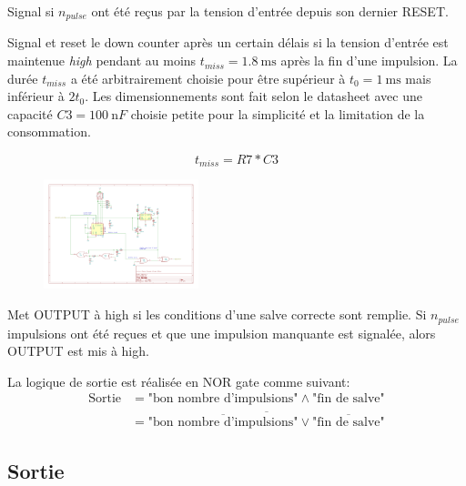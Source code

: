 \documentclass[french]{layout/Report}
\begin{document}
\begin{description}[leftmargin=!,labelwidth=4cm, labelindent=\parindent]
	\item[Down counter] Signal si $n_{pulse}$ ont été reçus par la tension d'entrée depuis son dernier RESET.
	\item[Missing pulse detector] Signal et reset le down counter après un certain délais si la tension d'entrée est maintenue \emph{high} pendant au moins $t_{miss} = \SI{1.8}{\milli\second}$ après la fin d'une impulsion. La durée $t_{miss}$ a été arbitrairement choisie pour être supérieur à $t_0 = \SI{1}{\milli\second}$ mais inférieur à $2t_0$. Les dimensionnements sont fait selon le datasheet \cite{TLC555} avec une capacité $\mathit{C3} = \SI{100}{\nano F}$ choisie petite pour la simplicité et la limitation de la consommation.

		\begin{equation*}
			t_{miss} = \mathit{R7}*\mathit{C3}
		\end{equation*}

		\begin{figure}[H]
			\centering
			\includegraphics[width=0.4\textwidth]{fig/decoder_reset_delay.pdf}
		\end{figure}

	\item[Logic] Met OUTPUT à high si les conditions d'une salve correcte sont remplie. Si $n_{pulse}$ impulsions ont été reçues et que une impulsion manquante est signalée, alors OUTPUT est mis à high. 

        La logique de sortie est réalisée en NOR gate comme suivant:
        \begin{align*}
        \text{Sortie} & = \text{"bon nombre d'impulsions"} \land \text{"fin de salve"} \\
        & = \overline{\overline{\text{"bon nombre d'impulsions"}} \lor \overline{\text{"fin de salve"}}}
        \end{align*}

\end{description}

\subsection{Sortie}
\end{document}
